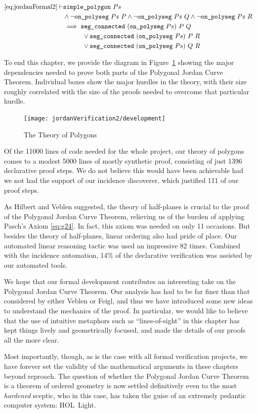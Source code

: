\begin{align}\ref{eq:jordanFormal2}
\vdash &\code{simple\_polygon}\ Ps\\
       &\wedge \neg\code{on\_polyseg}\ Ps\ P\wedge \neg\code{on\_polyseg}\ Ps\ Q\wedge \neg\code{on\_polyseg}\ Ps\ R\\
       &\implies \code{seg\_connected}\ (\code{on\_polyseg}\ Ps)\ P\ Q\\
       &\qquad\quad\vee \code{seg\_connected}\ (\code{on\_polyseg}\ Ps)\ P\ R\\
       &\qquad\quad\vee \code{seg\_connected}\ (\code{on\_polyseg}\ Ps)\ Q\ R
\end{align}

To end this chapter, we provide the diagram in Figure~\ref{fig:JordanTheoryOutline} showing the major dependencies needed to prove both parts of the Polygonal Jordan Curve Theorem. Individual boxes show the major hurdles in the theory, with their size roughly correlated with the size of the proofs needed to overcome that particular hurdle. 

\begin{figure}
\texttt{[image: jordanVerification2/development]}
\caption{The Theory of Polygons}
\label{fig:JordanTheoryOutline}
\end{figure}

Of the 11000 lines of code needed for the whole project, our theory of polygons comes to a modest 5000 lines of mostly synthetic proof, consisting of just 1396 declarative proof steps. We do not believe this would have been achievable had we not had the support of our incidence discoverer, which justified 111 of our proof steps. 

As Hilbert and Veblen suggested, the theory of half-planes is crucial to the proof of the Polygonal Jordan Curve Theorem, relieving us of the burden of applying Pasch's Axiom \eqref{eq:g24}. In fact, this axiom was needed on only 11 occasions. But besides the theory of half-planes, linear ordering also had pride of place. Our automated linear reasoning tactic was used an impressive 82 times. Combined with the incidence automation, 14\% of the declarative verification was assisted by our automated tools.

We hope that our formal development contributes an interesting take on the Polygonal Jordan Curve Theorem. Our analysis has had to be far finer than that considered by either Veblen or Feigl, and thus we have introduced some new ideas to understand the mechanics of the proof. In particular, we would like to believe that the use of intuitive metaphors such as ``lines-of-sight'' in this chapter has kept things lively and geometrically focused, and made the details of our proofs all the more clear. 

Most importantly, though, as is the case with all formal verification projects, we have forever set the validity of the mathematical arguments in these chapters beyond reproach. The question of whether the Polygonal Jordan Curve Theorem is a theorem of ordered geometry is now settled definitively even to the most \emph{hardened} sceptic, who in this case, has taken the guise of an extremely pedantic computer system: HOL~Light.

